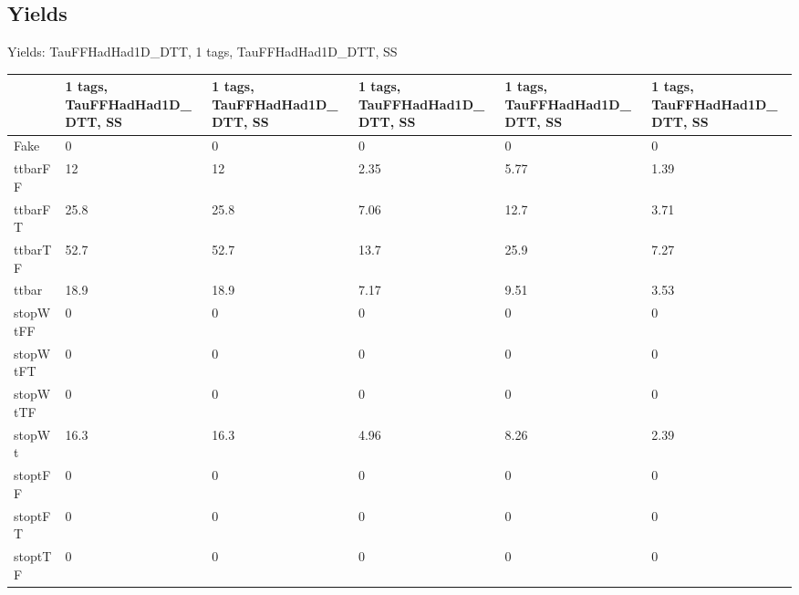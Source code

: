 
\subsection{Yields}

\begin{frame}{Yields: TauFFHadHad1D\_DTT, 1 tags, TauFFHadHad1D\_DTT, SS}
\begin{center}
  \begin{tabular}{l| >{\centering\let\newline\\\arraybackslash\hspace{0pt}}m{1.4cm}| >{\centering\let\newline\\\arraybackslash\hspace{0pt}}m{1.4cm}| >{\centering\let\newline\\\arraybackslash\hspace{0pt}}m{1.4cm}| >{\centering\let\newline\\\arraybackslash\hspace{0pt}}m{1.4cm}| >{\centering\let\newline\\\arraybackslash\hspace{0pt}}m{1.4cm}}
    & 1 tags, TauFFHadHad1D\_DTT, SS & 1 tags, TauFFHadHad1D\_DTT, SS & 1 tags, TauFFHadHad1D\_DTT, SS & 1 tags, TauFFHadHad1D\_DTT, SS & 1 tags, TauFFHadHad1D\_DTT, SS \\
 \hline \hline
    Fake& 0 & 0 & 0 & 0 & 0 \\
 \hline
    ttbarFF& 12 & 12 & 2.35 & 5.77 & 1.39 \\
 \hline
    ttbarFT& 25.8 & 25.8 & 7.06 & 12.7 & 3.71 \\
 \hline
    ttbarTF& 52.7 & 52.7 & 13.7 & 25.9 & 7.27 \\
 \hline
    ttbar& 18.9 & 18.9 & 7.17 & 9.51 & 3.53 \\
 \hline
    stopWtFF& 0 & 0 & 0 & 0 & 0 \\
 \hline
    stopWtFT& 0 & 0 & 0 & 0 & 0 \\
 \hline
    stopWtTF& 0 & 0 & 0 & 0 & 0 \\
 \hline
    stopWt& 16.3 & 16.3 & 4.96 & 8.26 & 2.39 \\
 \hline
    stoptFF& 0 & 0 & 0 & 0 & 0 \\
 \hline
    stoptFT& 0 & 0 & 0 & 0 & 0 \\
 \hline
    stoptTF& 0 & 0 & 0 & 0 & 0 \\

\end{tabular}
\end{center}
\end{frame}
